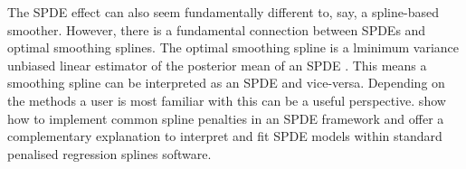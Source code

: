 \documentclass[preprint,12pt]{elsarticle}
\begin{document}
The SPDE effect can also seem fundamentally different to, say, a spline-based smoother.  However, there is a fundamental connection between SPDEs and optimal smoothing splines.  The optimal smoothing spline is a lminimum variance unbiased linear estimator of the posterior mean of an SPDE \citep{kimeldorf_spline_2002}.  This means a smoothing spline can be interpreted as an SPDE and vice-versa.  Depending on the methods a user is most familiar with this can be a useful perspective.  \cite{yue_bayesian_2014} show how to implement common spline penalties in an SPDE framework and \cite{miller_understanding_2019} offer a complementary explanation to interpret and fit SPDE models within standard penalised regression splines software.

\clearpage


\end{document}
